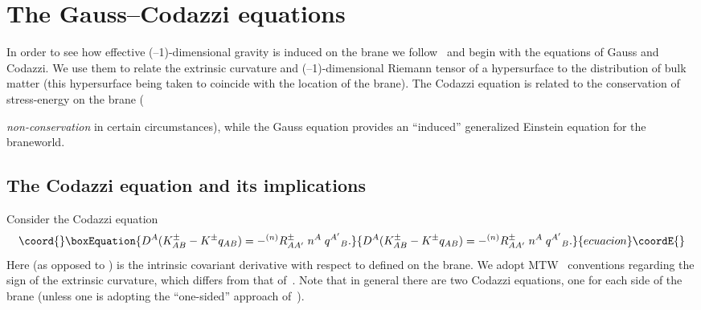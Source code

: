 \documentclass[a4paper,10pt]{article}
\begin{document}
\section{The Gauss--Codazzi equations}
\setcounter{equation}{0}

In order to see how effective (\coordHE{}--1)-dimensional gravity is induced
on the brane we follow~\cite{Shiromizu} and begin with the equations
of Gauss and Codazzi. We use them to relate the extrinsic curvature
and (\coordHE{}--1)-dimensional Riemann tensor of a hypersurface to the
distribution of bulk matter (this hypersurface being taken to coincide
with the location of the brane). The Codazzi equation is related to
the conservation of stress-energy on the brane
({\emph{non-conservation} in certain circumstances), while the Gauss
equation provides an ``induced'' generalized Einstein equation for the
braneworld.


\subsection{The Codazzi equation and its implications}

Consider the Codazzi equation~\cite{Shiromizu}
%
\begin{equation}\coord{}\boxEquation{
D^A (K_{AB}^\pm -  K^\pm q_{AB}) = - {}^{(n)}R_{AA'}^\pm \; n^A \; q^{A'}{}_B.
}{
D^A (K_{AB}^\pm -  K^\pm q_{AB}) = - {}^{(n)}R_{AA'}^\pm \; n^A \; q^{A'}{}_B.
}{ecuacion}\coordE{}\end{equation}
%
Here \coordHE{} (as opposed to \myHighlight{$\nabla$}\coordHE{}) is the intrinsic covariant
derivative with respect to \coordHE{} defined on the brane. We adopt
MTW~\cite{MTW} conventions regarding the sign of the extrinsic
curvature, which differs from that of~\cite{Shiromizu}. Note that in
general there are two Codazzi equations, one for each side of the
brane (unless one is adopting the ``one-sided'' approach
of~\cite{void,edge}).

}
\end{document}
